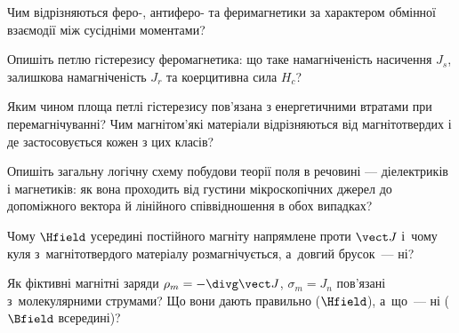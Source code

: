 \begin{Questions}
\begin{quizlist}
	\item Чим відрізняються феро-, антиферо- та феримагнетики за характером обмінної взаємодії між сусідніми моментами?
	\item Опишіть петлю гістерезису феромагнетика: що таке намагніченість насичення $J_s$, залишкова намагніченість $J_r$ та коерцитивна сила $H_c$?
	\item Яким чином площа петлі гістерезису пов'язана з енергетичними втратами при перемагнічуванні? Чим магнітом'які матеріали відрізняються від магнітотвердих і де застосовується кожен з цих класів?
	\item Опишіть загальну логічну схему побудови теорії поля в речовині --- діелектриків і магнетиків: як вона проходить від густини мікроскопічних джерел до допоміжного вектора й лінійного співвідношення в обох випадках?
	\item Чому $\Hfield$ усередині постійного магніту напрямлене проти $\vect J$ і~чому куля з~магнітотвердого матеріалу розмагнічується, а~довгий брусок~--- ні?
	\item Як фіктивні магнітні заряди $\rho_m=-\divg\vect J$, $\sigma_m=J_n$ пов'язані з~молекулярними струмами? Що вони дають правильно ($\Hfield$), а~що~--- ні ($\Bfield$ всередині)?
\end{quizlist}
\end{Questions}

